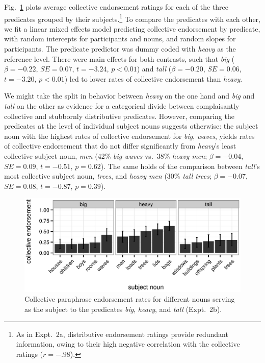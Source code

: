 \documentclass[preprint,12pt,authoryear,titlepage]{elsarticle}
\newcommand{\ndg}[1]{\textcolor{Green}{[ndg: #1]}}
\begin{document}

Fig.~\ref{bhtcoll} plots average collective endorsement ratings for each of the three predicates grouped by their subjects.\footnote{As in Expt.~2a, distributive endorsement ratings provide redundant information, owing to their high negative correlation with the collective ratings ($r=-.98$).}
%
%
To compare the predicates with each other, we fit a linear mixed effects model predicting collective endorsement by predicate, with random intercepts for participants and nouns, and random slopes for participants. The predicate predictor was dummy coded with \emph{heavy} as the reference level. There were main effects for both contrasts, such that \emph{big} ($\beta=-0.22$, $SE=0.07$, $t=-3.24$, $p<0.01$) and \emph{tall} ($\beta=-0.20$, $SE=0.06$, $t=-3.20$, $p<0.01$) led to lower rates of collective endorsement than \emph{heavy}. 

We might take the split in behavior between \emph{heavy} on the one hand and \emph{big} and \emph{tall} on the other as evidence for a categorical divide between complaisantly collective and stubbornly distributive predicates. However, comparing the predicates at the level of individual subject nouns suggests otherwise: the subject noun with the highest rates of collective endorsement for \emph{big}, \emph{waves}, yields rates of collective endorsement that do not differ significantly from \emph{heavy}'s least collective subject noun, \emph{men} (42\% \emph{big waves} vs.~38\% \emph{heavy men}; $\beta=-0.04$, $SE=0.09$, $t=-0.51$, $p=0.62$). The same holds of the comparison between \emph{tall}'s most collective subject noun, \emph{trees}, and \emph{heavy men} (30\% \emph{tall trees}; $\beta=-0.07$, $SE=0.08$, $t=-0.87$, $p=0.39$). 


\begin{figure}[htb]
	\centering
	\includegraphics[width=.85\linewidth]{plots/bht_plot.eps}
	\vspace{0pt}
	\caption{Collective paraphrase endorsement rates for different nouns serving as the subject to the predicates \emph{big}, \emph{heavy}, and \emph{tall} (Expt.~2b).} \label{bhtcoll}
\end{figure}
\end{document}
